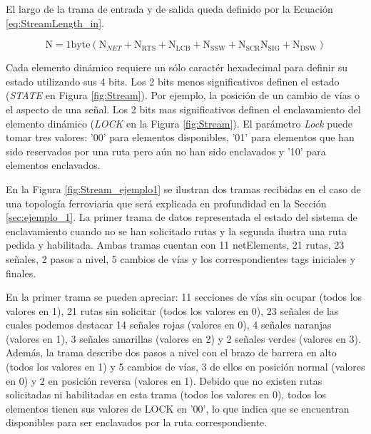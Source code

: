	El largo de la trama de entrada y de salida queda definido por la Ecuación \ref{eq:StreamLength_in}. 
	
	\begin{equation} 
		\label{eq:StreamLength_in}
		\text{N} = 1\text{byte} (\text{N}_{NET}+\text{N}_{\text{RTS}}+\text{N}_{\text{LCB}}+\text{N}_{\text{SSW}}+\text{N}_{\text{SCR}}\text{N}_{\text{SIG}}+\text{N}_{\text{DSW}})
	\end{equation}
	
	Cada elemento dinámico requiere un sólo caractér hexadecimal para definir su estado utilizando sus 4 bits. Los 2 bits menos significativos definen el estado (\textit{STATE} en Figura \ref{fig:Stream}). Por ejemplo, la posición de un cambio de vías o el aspecto de una señal. Los 2 bits mas significativos definen el enclavamiento del elemento dinámico (\textit{LOCK} en la Figura \ref{fig:Stream}). El parámetro \textit{Lock} puede tomar tres valores: '00' para elementos disponibles, '01' para elementos que han sido reservados por una ruta pero aún no han sido enclavados y '10' para elementos enclavados.
	
	En la Figura \ref{fig:Stream_ejemplo1} se ilustran dos tramas recibidas en el caso de una topología ferroviaria que será explicada en profundidad en la Sección \ref{sec:ejemplo_1}.  La primer trama de datos representada el estado del sistema de enclavamiento cuando no se han solicitado rutas y la segunda ilustra una ruta pedida y habilitada. Ambas tramas cuentan con 11 netElements, 21 rutas, 23 señales, 2 pasos a nivel, 5 cambios de vías y los correspondientes tags iniciales y finales.
	
	En la primer trama se pueden apreciar: 11 secciones de vías sin ocupar (todos los valores en 1), 21 rutas sin solicitar (todos los valores en 0), 23 señales de las cuales podemos destacar 14 señales rojas (valores en 0), 4 señales naranjas (valores en 1), 3 señales amarillas (valores en 2) y 2 señales verdes (valores en 3). Además, la trama describe dos pasos a nivel con el brazo de barrera en alto (todos los valores en 1) y 5 cambios de vías, 3 de ellos en posición normal (valores en 0) y 2 en posición reversa (valores en 1). Debido que no existen rutas solicitadas ni habilitadas en esta trama (todos los valores en 0), todos los elementos tienen sus valores de LOCK en '00', lo que indica que se encuentran disponibles para ser enclavados por la ruta correspondiente.
	
